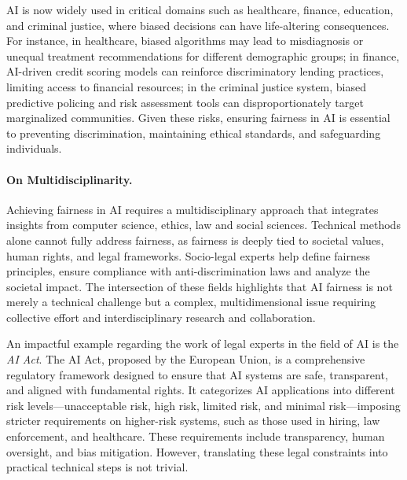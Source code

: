 \documentclass[12pt,a4paper,openright,twoside]{book}
\begin{document}

\ac{AI} is now widely used in critical domains such as healthcare, finance, education, and criminal justice, where biased decisions can have life-altering consequences.
%
For instance, in healthcare, biased algorithms may lead to misdiagnosis or unequal treatment recommendations for different demographic groups;
%
in finance, \ac{AI}-driven credit scoring models can reinforce discriminatory lending practices, limiting access to financial resources;
%
in the criminal justice system, biased predictive policing and risk assessment tools can disproportionately target marginalized communities.
%
Given these risks, ensuring fairness in \ac{AI} is essential to preventing discrimination, maintaining ethical standards, and safeguarding individuals.


\paragraph{On Multidisciplinarity.}


Achieving fairness in \ac{AI} requires a multidisciplinary approach that integrates insights from computer science, ethics, law and social sciences.
%
Technical methods alone cannot fully address fairness, as fairness is deeply tied to societal values, human rights, and legal frameworks.
%
Socio-legal experts help define fairness principles, ensure compliance with anti-discrimination laws and analyze the societal impact.
%
The intersection of these fields highlights that \ac{AI} fairness is not merely a technical challenge but a complex, multidimensional issue requiring collective effort and interdisciplinary research and collaboration.


An impactful example regarding the work of legal experts in the field of \acl{AI} is the \textit{AI Act}. 
%
The AI Act, proposed by the European Union, is a comprehensive regulatory framework designed to ensure that AI systems are safe, transparent, and aligned with fundamental rights.
%
It categorizes AI applications into different risk levels—unacceptable risk, high risk, limited risk, and minimal risk—imposing stricter requirements on higher-risk systems, such as those used in hiring, law enforcement, and healthcare.
%
These requirements include transparency, human oversight, and bias mitigation.
%
However, translating these legal constraints into practical technical steps is not trivial.
\end{document}
